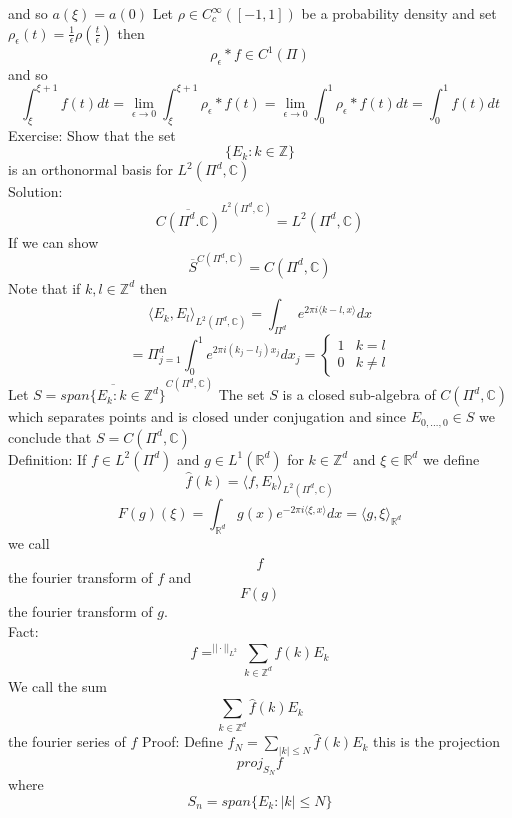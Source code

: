 \documentclass[11pt]{article}
\begin{document}
and so $a(\xi) = a(0)$
Let  $\rho \in C_c^{\infty}([-1,1])$ be a probability density 
and set $\rho_\epsilon(t) = \frac{1}{\epsilon}\rho(\frac{t}{\epsilon})$ then
\[
    \rho_{\epsilon} * f \in C^{1}(\Pi)
\] 
and so
\[
    \int_{\xi}^{\xi+1}f(t)dt = \lim_{\epsilon\to 0} \int_{\xi}^{\xi+1} \rho_{\epsilon} * f(t) = \lim_{\epsilon\to 0 } \int_{0}^{1}\rho_{\epsilon} * f(t)dt = \int_{0}^{1}f(t)dt
\] 
Exercise:
Show that the set
\[
\{E_k : k \in \mathbb{Z}\}
\] 
is an orthonormal basis for $L^{2}(\Pi^{d}, \mathbb{C})$ \\
Solution:
\[
    \overline{C( \Pi^{d}. \mathbb{C})}^{L^2(\Pi^{d}, \mathbb{C})} = L^2(\Pi^{d}, \mathbb{C})
\] 
If we can show
\[
\overline{S}^{C(\Pi^{d}, \mathbb{C})} = C(\Pi^{d}, \mathbb{C})
\] 
Note that if $k, l \in \mathbb{Z}^{d} $ then
\[
    \langle E_k, E_l \rangle_{L^2(\Pi^{d}, \mathbb{C})} = \int_{\Pi^{d}}^{}e^{2\pi i \langle k-l,x \rangle}dx
\] 
\[
 = \Pi_{j=1}^{d} \int_{0}^{1} e^{2\pi i (k_j - l_j)x_j}dx_j = 
\begin{cases}
    1 & k = l\\
    0 & k \ne l
\end{cases}
\] 
Let $S = \overline{span\{ E_k : k \in \mathbb{Z}^{d}\}}^{C(\Pi^{d}, \mathbb{C})}$ 
The set $S$ is a closed sub-algebra of  $C(\Pi^{d}, \mathbb{C})$ which separates points and is closed
under conjugation and since $E_{0,\dots,0} \in S$ we conclude that
$S = C( \Pi^{d}, \mathbb{C})$\\
Definition:
If $f \in L^2( \Pi^{d})$ and $g \in L^{1}( \mathbb{R}^{d})$ for
$k \in \mathbb{Z}^{d}$ and $\xi \in \mathbb{R}^{d}$ we define
\[
    \hat f(k) = \langle f, E_k \rangle_{L^2(\Pi^{d}, \mathbb{C})} 
\] 
\[
    F(g)(\xi) = \int_{ \mathbb{R}^{d}}^{}g(x)e^{-2\pi i \langle \xi ,x\rangle}dx= \langle g, \xi \rangle_{ \mathbb{R}^{d}}
\] 
we call
\[
    \hat f
\] 
the fourier transform of $f$ and
 \[
F(g) 
\] 
the fourier transform of $g$.\\
Fact: 
\[
    f =^{||\cdot||_{L^2}} \sum_{k \in \mathbb{Z}^{d}}^{} \hat f(k) E_k
\] 
We call the sum
\[
\sum_{k \in \mathbb{Z}^{d}}^{} \hat f(k) E_k
\] 
the fourier series of $f$
Proof: Define  $f_N = \sum_{|k| \le N}^{} \hat f(k) E_k$  this is the projection
\[
    proj_{S_N} f
\] 
where
\[
    S_n = span\{E_k : |k| \le N\}
\] 
\end{document}
